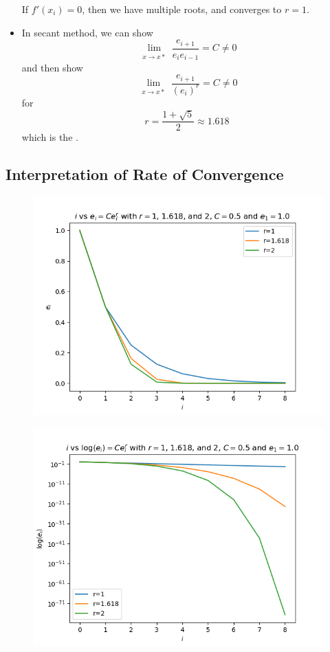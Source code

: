 \begin{itemize}
          \begin{remark}
              If \( f'(x_i) = 0 \), then we have multiple roots, and converges to \( r = 1 \).
          \end{remark}

    \item In secant method, we can show \[
              \lim_{\substack{x \to x\ast}} \frac{e_{i+1}}{e_i e_{i-1}} = C \neq 0
          \] and then show \[
              \lim_{\substack{x \to x\ast}} \frac{e_{i+1}}{(e_i)^r} = C \neq 0
          \] for \[
              r = \frac{1 + \sqrt{5}}{2} \approx 1.618
          \] which is the .
\end{itemize}

\subsection{Interpretation of Rate of Convergence}

\vspace{-2em}
\begin{figure}[H]
    \centering
    \includegraphics[width=0.67\linewidth]{figures/rate_of_convergence_e_i.png}
\end{figure}
\begin{figure}[H]
    \centering
    \includegraphics[width=0.67\linewidth]{figures/rate_of_convergence_log_e_i.png}
\end{figure}

